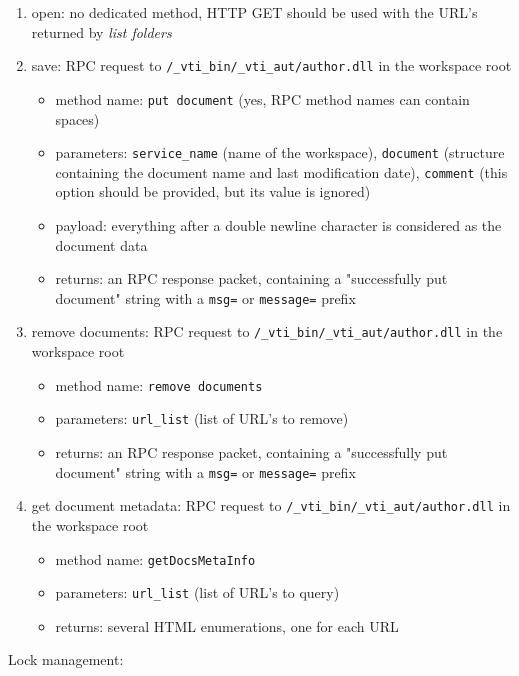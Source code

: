 \begin{enumerate}
\item open: no dedicated method, HTTP GET should be used with the URL's returned by \emph{list folders}
\item save: RPC request to \texttt{/\_vti\_bin/\_vti\_aut/author.dll} in the workspace root
\begin{itemize}
\item method name: \texttt{put document} (yes, RPC method names can contain spaces)
\item parameters: \texttt{service\_name} (name of the workspace), \texttt{document} (structure containing the document name and last modification date), \texttt{comment} (this option should be provided, but its value is ignored)
\item payload: everything after a double newline character is considered as the document data
\item returns: an RPC response packet, containing a "successfully put document" string with a \texttt{msg=} or \texttt{message=} prefix
\end{itemize}

\item remove documents: RPC request to \texttt{/\_vti\_bin/\_vti\_aut/author.dll} in the workspace root
\begin{itemize}
\item method name: \texttt{remove documents}
\item parameters: \texttt{url\_list} (list of URL's to remove)
\item returns: an RPC response packet, containing a "successfully put document" string with a \texttt{msg=} or \texttt{message=} prefix
\end{itemize}

\item get document metadata: RPC request to \texttt{/\_vti\_bin/\_vti\_aut/author.dll} in the workspace root
\begin{itemize}
\item method name: \texttt{getDocsMetaInfo}
\item parameters: \texttt{url\_list} (list of URL's to query)
\item returns: several HTML enumerations, one for each URL
\end{itemize}
\end{enumerate}

Lock management:

